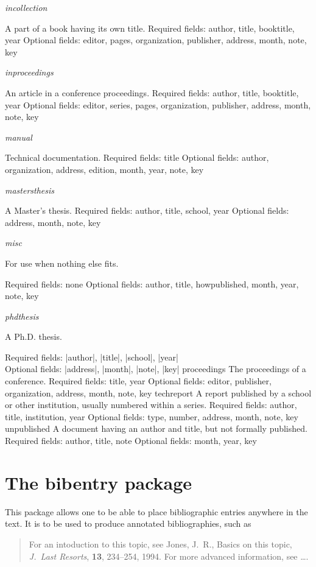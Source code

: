 \emph{incollection}

    A part of a book having its own title.
    Required fields: author, title, booktitle, year
    Optional fields: editor, pages, organization, publisher, address, month, note, key

\emph{inproceedings}

An article in a conference proceedings.
Required fields: author, title, booktitle, year
Optional fields: editor, series, pages, organization, publisher, address, month, note, key

\emph{manual}

Technical documentation.
Required fields: title
Optional fields: author, organization, address, edition, month, year, note, key

\emph{mastersthesis}

A Master's thesis.
Required fields: author, title, school, year
Optional fields: address, month, note, key

\emph{misc}

For use when nothing else fits.

Required fields: none
Optional fields: author, title, howpublished, month, year, note, key

\emph{phdthesis}

A Ph.D. thesis.

Required fields: |author|, |title|, |school|, |year|\\
Optional fields: |address|, |month|, |note|, |key|
proceedings
The proceedings of a conference.
Required fields: title, year
Optional fields: editor, publisher, organization, address, month, note, key
techreport
A report published by a school or other institution, usually numbered within a series.
Required fields: author, title, institution, year
Optional fields: type, number, address, month, note, key
unpublished
A document having an author and title, but not formally published.
Required fields: author, title, note
Optional fields: month, year, key

\section{The bibentry package}

 This package allows one to be able to place bibliographic entries anywhere
 in the text. It is to be used to produce annotated bibliographies, such as
 \begin{quote}
   For an intoduction to this topic, see Jones, J.~R., Basics on this topic,
   {\it J.\ Last Resorts}, \textbf{13}, 234--254, 1994. For more advanced
   information, see \dots.
 \end{quote}

